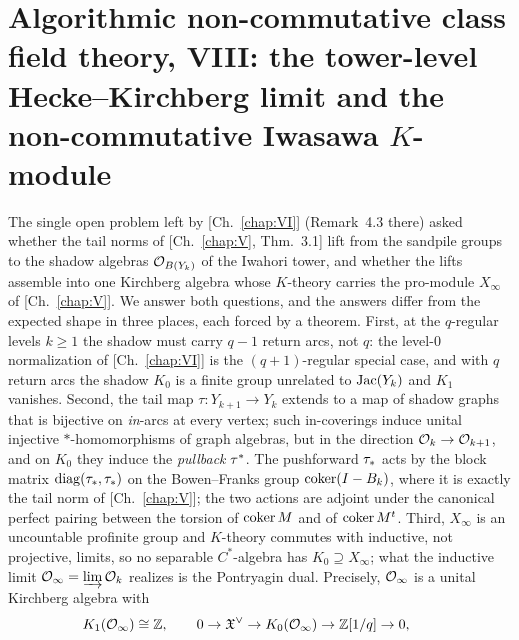 \renewcommand{\shadow}[1]{{#1}^{\sharp}}
\chapter[\texorpdfstring{VIII. The tower-level Hecke--Kirchberg limit and the non-commutative Iwasawa $K$-module}{VIII. The tower-level Hecke-Kirchberg limit and the non-commutative Iwasawa K-module}]{\texorpdfstring{Algorithmic non-commutative class field theory, VIII: the tower-level Hecke--Kirchberg limit and the non-commutative Iwasawa $K$-module}{Algorithmic non-commutative class field theory, VIII: the tower-level Hecke-Kirchberg limit and the non-commutative Iwasawa K-module}}\label{chap:VIII}
\begin{chapterabstract}
The single open problem left by [Ch.~\ref{chap:VI}] (Remark~4.3 there) asked whether the tail norms of
[Ch.~\ref{chap:V}, Thm.~3.1] lift from the sandpile groups to the shadow algebras
$\mathcal{O}_{B(Y_k)}$ of the Iwahori tower, and whether the lifts assemble into one Kirchberg
algebra whose $K$-theory carries the pro-module $X_\infty$ of [Ch.~\ref{chap:V}]. We answer both
questions, and the answers differ from the expected shape in three places, each forced
by a theorem. First, at the $q$-regular levels $k\ge1$ the shadow must carry $q-1$
return arcs, not $q$: the level-$0$ normalization of [Ch.~\ref{chap:VI}] is the $(q{+}1)$-regular
special case, and with $q$ return arcs the shadow $K_0$ is a finite group unrelated to
$\operatorname{Jac}(Y_k)$ and $K_1$ vanishes. Second, the tail map $\tau\colon Y_{k+1}\to Y_k$ extends
to a map of shadow graphs that is bijective on \emph{in}-arcs at every vertex; such
in-coverings induce unital injective $*$-homomorphisms of graph algebras, but in the
direction $\mathcal{O}_k\to\mathcal{O}_{k+1}$, and on $K_0$ they induce the \emph{pullback} $\tau^*$. The
pushforward $\tau_*$ acts by the block matrix $\operatorname{diag}(\tau_*,\tau_*)$ on the
Bowen--Franks group $\operatorname{coker}(I-B_k)$, where it is exactly the tail norm of [Ch.~\ref{chap:V}]; the two
actions are adjoint under the canonical perfect pairing between the torsion of
$\operatorname{coker} M$ and of $\operatorname{coker} M^{t}$. Third, $X_\infty$ is an uncountable profinite group
and $K$-theory commutes with inductive, not projective, limits, so no separable
$C^*$-algebra has $K_0\supseteq X_\infty$; what the inductive limit
$\mathcal{O}_\infty=\varinjlim\mathcal{O}_k$ realizes is the Pontryagin dual. Precisely, $\mathcal{O}_\infty$ is
a unital Kirchberg algebra with
\[
K_1(\mathcal{O}_\infty)\cong\mathbb{Z},\qquad
0\to\mathfrak{X}^{\vee}\to K_0(\mathcal{O}_\infty)\to\mathbb{Z}[1/q]\to0,\qquad
\]
\end{chapterabstract}
